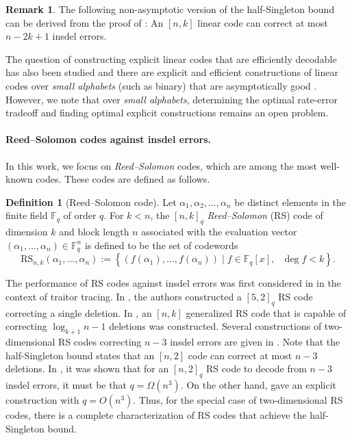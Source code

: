 \documentclass[11pt]{article}
\theoremstyle{plain}
\theoremstyle{definition}
\newtheorem{defn}[thm]{Definition}
\newtheorem*{rmk}{Remark}
\theoremstyle{remark}
\newcommand{\F}{\mathbb{F}}
\begin{document}
    
    \begin{rmk}
        \label{main-remark}
        The following  non-asymptotic version of the half-Singleton bound can be derived from the proof of \cite[Corollary 5.2]{cheng2020efficient}:  
        An $[n,k]$ linear code can correct at most  $n-2k+1$ insdel errors. 
    \end{rmk}
The question of constructing explicit linear codes that are efficiently decodable has also been studied and there are explicit and efficient constructions of linear codes over \emph{small alphabets} (such as binary) that are asymptotically good \cite{con2022explicit,cheng2023linear}. However, we note that over \emph{small alphabets}, determining the optimal rate-error tradeoff and finding optimal explicit constructions remains an open problem.



\paragraph{Reed--Solomon codes against insdel errors.}
In this work, we focus on \emph{Reed--Solomon} codes, which are among the most well-known codes. These codes are defined as follows.
\begin{defn}[Reed--Solomon code]
    Let $\alpha_1, \alpha_2, \ldots, \alpha_n$ be distinct elements in the finite field $\mathbb{F}_q$ of order  $q$. For $k<n$, the $[n,k]_q$ \emph{Reed--Solomon} (RS) code of dimension $k$ and block length $n$ associated with the evaluation vector $(\alpha_1, \ldots, \alpha_n)\in\F_q^n$ is defined to be the set of codewords 
    \[
    \text{RS}_{n,k}(\alpha_1, \ldots, \alpha_n) := \left \lbrace \left( f(\alpha_1), \ldots, f(\alpha_n) \right) \mid f\in \mathbb{F}_q[x],\text{ }\deg f < k \right \rbrace.
    \]	
\end{defn}

The performance of RS codes against insdel errors was first considered in \cite{safavi2002traitor} in the context of traitor tracing. In \cite{wang2004deletion}, the authors constructed a $[5,2]_q$ RS code correcting a single deletion. In \cite{tonien2007construction}, an $[n,k]$ generalized RS code that is capable of correcting $\log_{k+1}n - 1$ deletions was constructed. 
Several constructions of two-dimensional RS codes correcting $n-3$ insdel errors are given in \cite{duc2019explicit,liu20212}. Note that the half-Singleton bound states that an $[n,2]$ code can correct at most $n-3$ deletions. In \cite{con2023reed}, it was shown that for an $[n,2]_q$ RS code to decode from $n-3$ insdel errors, it must be that $q=\Omega(n^3)$. On the other hand, \cite{con2023optimal} gave an explicit construction with $q=O(n^3)$. Thus, for the special case of two-dimensional RS codes, there is a complete characterization of RS codes that achieve the half-Singleton bound.
\end{document}
